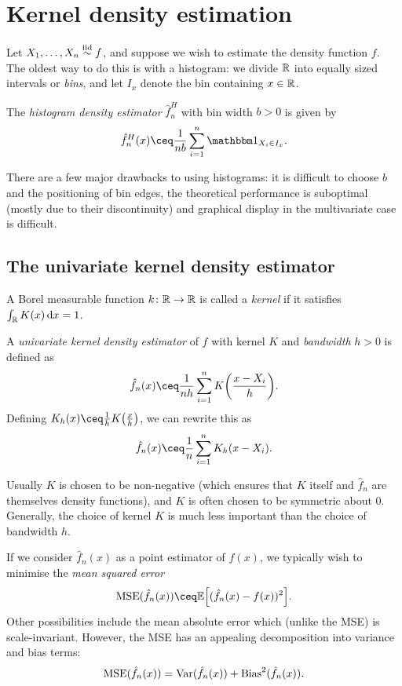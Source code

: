 \section{Kernel density estimation}
Let $X_1, \dotsc, X_n \overset{\mathrm{iid}}{\sim} f$, and suppose we wish to estimate the density function $f$. The oldest way to do this is with a histogram: we divide $\mathbb R$ into equally sized intervals or \emph{bins}, and let $I_x$ denote the bin containing $x \in \mathbb R$.
\begin{definition}
	The \emph{histogram density estimator} $\hat f_n^H$ with bin width $b > 0$ is given by
	\[
	\hat f_n^H(x) \ceq \frac{1}{nb} \sum_{i=1}^n \ind_{X_i \in I_x}.  
	\]
\end{definition}

There are a few major drawbacks to using histograms: it is difficult to choose $b$ and the positioning of bin edges, the theoretical performance is suboptimal (mostly due to their discontinuity) and graphical display in the multivariate case is difficult. 

\subsection{The univariate kernel density estimator}
\begin{definition}
	A Borel measurable function $k \colon \mathbb R \to \mathbb R$ is called a \emph{kernel} if it satisfies $\int_\mathbb R K(x) \dd{x} = 1$. 
	
	A \emph{univariate kernel density estimator} of $f$ with kernel $K$ and \emph{bandwidth} $h > 0$ is defined as
	\[
	\hat f_n(x) \ceq \frac1{nh} \sum_{i=1}^n K\qty(\frac{x - X_i}{h}).
	\]
	Defining $K_h(x) \ceq \frac1h K\qty(\frac xh)$, we can rewrite this as
	\[
	\hat f_n(x) \ceq \frac1n \sum_{i=1}^n K_h(x - X_i). 
	\]
\end{definition}

Usually $K$ is chosen to be non-negative (which ensures that $K$ itself and $\hat f_n$ are themselves density functions), and $K$ is often chosen to be symmetric about 0. Generally, the choice of kernel $K$ is much less important than the choice of bandwidth $h$. 

If we consider $\hat f_n(x)$ as a point estimator of $f(x)$, we typically wish to minimise the \emph{mean squared error}
\[
\MSE(\hat f_n(x)) \ceq \EE\qty[(\hat f_n(x) - f(x))^2]. 
\]
Other possibilities include the mean absolute error which (unlike the MSE) is scale-invariant. However, the MSE has an appealing decomposition into variance and bias terms:
\[
\operatorname{MSE}(\hat f_n(x)) = \operatorname{Var}(\hat f_n(x)) + \operatorname{Bias}^2(\hat f_n(x)). 
\]

